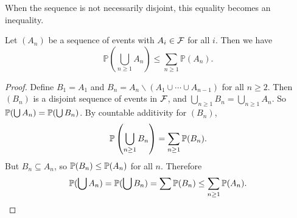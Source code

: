 \documentclass[a4paper]{scrreprt}
\begin{document}
When the sequence is not necessarily disjoint, this equality becomes an inequality. 

\begin{proposition}
	Let $(A_n)$ be a sequence of events with $A_i \in \mathcal{F}$ for all $i$. Then we have
	$$
	\mathbb{P}\left(\bigcup_{n \geq 1} A_{n}\right) \leq \sum_{n \geq 1} \mathbb{P}\left(A_{n}\right).
	$$
\end{proposition}
\begin{proof}
	Define $B_1 = A_1$ and $B_n = A_n \backslash (A_1 \cup \cdots \cup A_{n - 1})$ for all $n \geq 2$. Then $(B_n)$ is a disjoint sequence of events in $\mathcal{F}$, and $\bigcup_{n \geq 1} B_n = \bigcup_{n \geq 1} A_n$. So $\mathbb{P}(\bigcup A_n) = \mathbb{P}(\bigcup B_n)$. By countable additivity for $(B_n)$,
	$$
	\mathbb{P} \left(\bigcup_{n \geq 1} B_n\right) = \sum_{n \geq 1} \mathbb{P}(B_n).
	$$
	But $B_n \subseteq A_n$, so $\mathbb{P}(B_n) \leq \mathbb{P}(A_n)$ for all $n$. Therefore
	$$
	\mathbb{P}(\bigcup A_n) = \mathbb{P}(\bigcup B_n) = \sum \mathbb{P}(B_n) \leq \sum_{n \geq 1} \mathbb{P}(A_n).
	$$
\end{proof}
\end{document}
